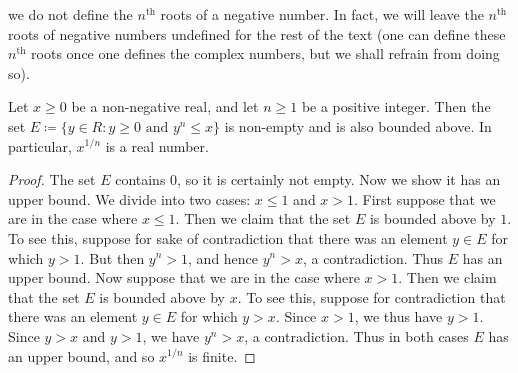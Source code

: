 \begin{note}
    we do not define the \(n^{\text{th}}\) roots of a negative number.
    In fact, we will leave the \(n^{\text{th}}\) roots of negative numbers undefined for the rest of the text
    (one can define these \(n^{\text{th}}\) roots once one defines the complex numbers, but we shall refrain from doing so).
\end{note}

\begin{lemma}\label{5.6.5}
    Let \(x \geq 0\) be a non-negative real, and let \(n \geq 1\) be a positive integer.
    Then the set \(E \coloneqq \{y \in R : y \geq 0 \text{ and } y^n \leq x\}\) is non-empty and is also bounded above.
    In particular, \(x^{1 / n}\) is a real number.
\end{lemma}

\begin{proof}
    The set \(E\) contains \(0\), so it is certainly not empty.
    Now we show it has an upper bound.
    We divide into two cases: \(x \leq 1\) and \(x > 1\).
    First suppose that we are in the case where \(x \leq 1\).
    Then we claim that the set \(E\) is bounded above by \(1\).
    To see this, suppose for sake of contradiction that there was an element \(y \in E\) for which \(y > 1\).
    But then \(y^n > 1\), and hence \(y^n > x\), a contradiction.
    Thus \(E\) has an upper bound.
    Now suppose that we are in the case where \(x > 1\).
    Then we claim that the set \(E\) is bounded above by \(x\).
    To see this, suppose for contradiction that there was an element \(y \in E\) for which \(y > x\).
    Since \(x > 1\), we thus have \(y > 1\).
    Since \(y > x\) and \(y > 1\), we have \(y^n > x\), a contradiction.
    Thus in both cases \(E\) has an upper bound, and so \(x^{1 / n}\) is finite.
\end{proof}

